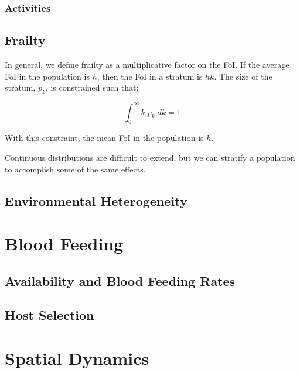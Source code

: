 \documentclass[
]{book}
\begin{document}
\hypertarget{activities}{%
\subsection{Activities}\label{activities}}

\hypertarget{frailty}{%
\section{Frailty}\label{frailty}}

In general, we define frailty as a multiplicative factor on the FoI. If the average FoI in the population is \(h\), then the FoI in a stratum is \(hk\). The size of the stratum, \(p_k\), is constrained such that:

\[\int_0^\infty k \; p_k \; dk = 1\]

With this constraint, the mean FoI in the population is \(h\).

Continuous distributions are difficult to extend, but we can stratify a population to accomplish some of the same effects.

\hypertarget{environmentalHeterogeneity}{%
\section{Environmental Heterogeneity}\label{environmentalHeterogeneity}}

\hypertarget{blood-feeding-1}{%
\chapter{Blood Feeding}\label{blood-feeding-1}}

\hypertarget{availability-and-blood-feeding-rates}{%
\section{Availability and Blood Feeding Rates}\label{availability-and-blood-feeding-rates}}

\hypertarget{host-selection}{%
\section{Host Selection}\label{host-selection}}

\hypertarget{spatial-dynamics}{%
\chapter{Spatial Dynamics}\label{spatial-dynamics}}
\end{document}
